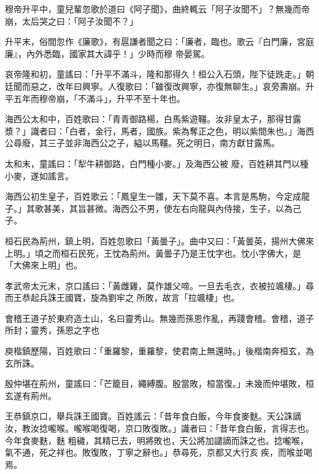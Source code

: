 \begin{pinyinscope}
 穆帝升平中，童兒輩忽歌於道曰《阿子聞》，曲終輒云「阿子汝聞不」？無幾而帝崩，太后哭之曰：「阿子汝聞不？」



 升平末，俗間忽作《廉歌》，有扈謙者聞之曰：「廉者，臨也。歌云『白門廉，宮庭廉』，內外悉臨，國家其大諱乎！」少時而穆
 帝晏駕。



 哀帝隆和初，童謠曰：「升平不滿斗，隆和那得久！桓公入石頭，陛下徒跣走。」朝廷聞而惡之，改年曰興寧。人復歌曰：「雖復改興寧，亦復無聊生。」哀旁壽崩。升平五年而穆帝崩，「不滿斗」，升平不至十年也。



 海西公太和中，百姓歌曰：「青青御路楊，白馬紫遊韁。汝非皇太子，那得甘露漿？」識者曰：「白者，金行，馬者，國族。紫為奪正之色，明以紫間朱也。」海西公尋廢，其三子並非海西公之子，縊以馬韁。死之明日，南方獻甘露馬。



 太和末，童謠曰：「犁牛耕御路，白門種小麥。」及海西公被
 廢，百姓耕其門以種小麥，遂如謠言。



 海西公初生皇子，百姓歌云：「鳳皇生一雛，天下莫不喜。本言是馬駒，今定成龍子。」其歌甚美，其旨甚微。海西公不男，使左右向龍與內侍接，生子，以為己子。



 桓石民為荊州，鎮上明，百姓忽歌曰「黃曇子」。曲中又曰：「黃曇英，揚州大佛來上明。」頃之而桓石民死，王忱為荊州。黃曇子乃是王忱字也。忱小字佛大，是「大佛來上明」也。



 孝武帝太元末，京口謠曰：「黃雌雞，莫作雄父啼。一旦去毛衣，衣被拉颯棲。」尋而王恭起兵誅王國寶，旋為劉牢之
 所敗，故言「拉颯棲」也。



 會稽王道子於東府造土山，名曰靈秀山。無幾而孫恩作亂，再踐會稽。會稽，道子所封；靈秀，孫恩之字也



 庾楷鎮歷陽，百姓歌曰：「重羅黎，重羅黎，使君南上無還時。」後楷南奔桓玄，為玄所誅。



 殷仲堪在荊州，童謠曰：「芒籠目，繩縛腹。殷當敗，桓當復。」未幾而仲堪敗，桓玄遂有荊州。



 王恭鎮京口，舉兵誅王國寶。百姓謠云：「昔年食白飯，今年食麥麩。天公誅謫汝，教汝捻嚨喉。嚨喉喝復喝，京口敗復敗。」識者曰：「昔年食白飯，言得志也。今年食麥麩，麩
 粗穢，其精已去，明將敗也，天公將加譴謫而誅之也。捻嚨喉，氣不通，死之祥也。敗復敗，丁寧之辭也。」恭尋死，京都又大行亥疾，而喉並喝焉。




\end{pinyinscope}
